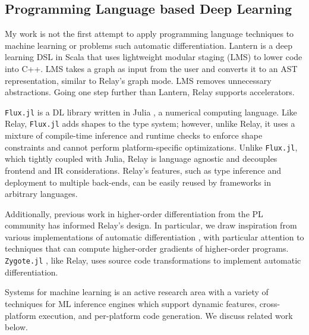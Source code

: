 \subsection{Programming Language based Deep Learning}

My work is not the first attempt to apply programming language
    techniques to machine learning or problems such automatic differentiation.
Lantern \citep{lantern} is a deep learning DSL in Scala
    that uses lightweight modular staging (LMS) to lower code into C++.
LMS takes a graph as input from the user and converts it to an AST
    representation, similar to Relay's graph mode.
LMS removes unnecessary abstractions.
Going one step further than Lantern,
    Relay supports accelerators.

\verb|Flux.jl| \citep{fluxjl} is a DL library written in Julia \citep{julia}, a numerical
computing language. Like Relay, \verb|Flux.jl| adds shapes to the type system; however, unlike Relay, it
uses a mixture of compile-time inference and runtime checks to enforce shape constraints
\citep{jlmlpl} and cannot perform platform-specific optimizations. Unlike \verb|Flux.jl|, which
tightly coupled with Julia, Relay is language agnostic and decouples frontend and IR
considerations.
Relay's features, such as type inference and deployment to multiple back-ends, can
    be easily reused by frameworks in arbitrary languages.

Additionally, previous work in higher-order differentiation from the PL community
has informed Relay's design.
In particular, we draw inspiration from various implementations of
automatic differentiation \citep{beautiful_diff, ad_survey, haskell_ad, toplas_reverse, wang_reverse, DLS, DDF},
with particular attention to techniques that can compute higher-order gradients of higher-order programs.
\verb|Zygote.jl| \citep{zygotejl}, like Relay, uses source code transformations to
    implement automatic differentiation.


Systems for machine learning is an active research area with a variety of techniques for ML inference engines which support dynamic features, cross-platform execution, and per-platform code generation. We discuss related work below.

